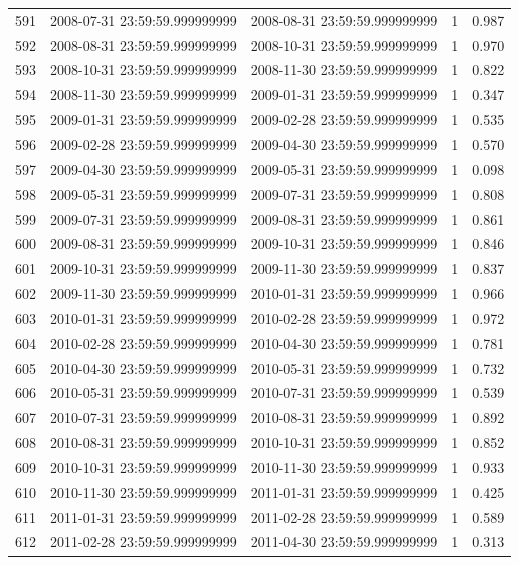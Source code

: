 \begin{table}
\begin{tabular}{lcccc}
591 & 2008-07-31 23:59:59.999999999 & 2008-08-31 23:59:59.999999999 & 1 & 0.987 \\
592 & 2008-08-31 23:59:59.999999999 & 2008-10-31 23:59:59.999999999 & 1 & 0.970 \\
593 & 2008-10-31 23:59:59.999999999 & 2008-11-30 23:59:59.999999999 & 1 & 0.822 \\
594 & 2008-11-30 23:59:59.999999999 & 2009-01-31 23:59:59.999999999 & 1 & 0.347 \\
595 & 2009-01-31 23:59:59.999999999 & 2009-02-28 23:59:59.999999999 & 1 & 0.535 \\
596 & 2009-02-28 23:59:59.999999999 & 2009-04-30 23:59:59.999999999 & 1 & 0.570 \\
597 & 2009-04-30 23:59:59.999999999 & 2009-05-31 23:59:59.999999999 & 1 & 0.098 \\
598 & 2009-05-31 23:59:59.999999999 & 2009-07-31 23:59:59.999999999 & 1 & 0.808 \\
599 & 2009-07-31 23:59:59.999999999 & 2009-08-31 23:59:59.999999999 & 1 & 0.861 \\
600 & 2009-08-31 23:59:59.999999999 & 2009-10-31 23:59:59.999999999 & 1 & 0.846 \\
601 & 2009-10-31 23:59:59.999999999 & 2009-11-30 23:59:59.999999999 & 1 & 0.837 \\
602 & 2009-11-30 23:59:59.999999999 & 2010-01-31 23:59:59.999999999 & 1 & 0.966 \\
603 & 2010-01-31 23:59:59.999999999 & 2010-02-28 23:59:59.999999999 & 1 & 0.972 \\
604 & 2010-02-28 23:59:59.999999999 & 2010-04-30 23:59:59.999999999 & 1 & 0.781 \\
605 & 2010-04-30 23:59:59.999999999 & 2010-05-31 23:59:59.999999999 & 1 & 0.732 \\
606 & 2010-05-31 23:59:59.999999999 & 2010-07-31 23:59:59.999999999 & 1 & 0.539 \\
607 & 2010-07-31 23:59:59.999999999 & 2010-08-31 23:59:59.999999999 & 1 & 0.892 \\
608 & 2010-08-31 23:59:59.999999999 & 2010-10-31 23:59:59.999999999 & 1 & 0.852 \\
609 & 2010-10-31 23:59:59.999999999 & 2010-11-30 23:59:59.999999999 & 1 & 0.933 \\
610 & 2010-11-30 23:59:59.999999999 & 2011-01-31 23:59:59.999999999 & 1 & 0.425 \\
611 & 2011-01-31 23:59:59.999999999 & 2011-02-28 23:59:59.999999999 & 1 & 0.589 \\
612 & 2011-02-28 23:59:59.999999999 & 2011-04-30 23:59:59.999999999 & 1 & 0.313 \\

\end{tabular}
\end{table}
